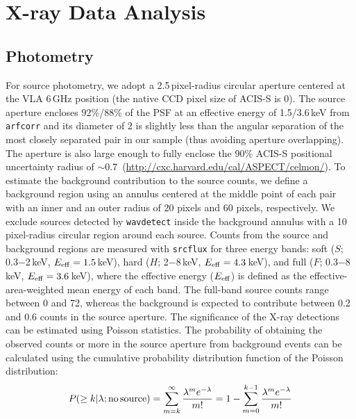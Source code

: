 \documentclass[iop,revtex4,twocolumn,apj,numberedappendix,appendixfloats]{emulateapj}
\begin{document}
\section{X-ray Data Analysis} \label{sec:analysis}

\subsection{Photometry} \label{sec:photo}

For source photometry, we adopt a 2.5\,pixel-radius circular aperture centered at the VLA 6\,GHz position (the native CCD pixel size of ACIS-S is 0). The source aperture encloses 92\%/88\% of the PSF at an effective energy of 1.5/3.6\,keV from \texttt{arfcorr} and its diameter of 2 is slightly less than the angular separation of the most closely separated pair in our sample (thus avoiding aperture overlapping). The aperture is also large enough to fully enclose the 90\% ACIS-S positional uncertainty radius of $\sim$0.7\arcsec\ (\url{http://cxc.harvard.edu/cal/ASPECT/celmon/}). To estimate the background contribution to the source counts, we define a background region using an annulus centered at the middle point of each pair with an inner and an outer radius of 20 pixels and 60 pixels, respectively. We exclude sources detected by \texttt{wavdetect} inside the background annulus with a 10\,pixel-radius circular region around each source. Counts from the source and background regions are measured with \texttt{srcflux} for three energy bands: soft ($S$; 0.3$-$2\,keV, $E_{\rm eff} = 1.5$\,keV), hard ($H$; 2$-$8\,keV, $E_{\rm eff} = 4.3$\,keV), and full ($F$; 0.3$-$8\,keV, $E_{\rm eff} = 3.6$\,keV), where the effective energy ($E_{\rm eff}$) is defined as the effective-area-weighted mean energy of each band. The full-band source counts range between 0 and 72, whereas the background is expected to contribute between 0.2 and 0.6 counts in the source aperture. The significance of the X-ray detections can be estimated using Poisson statistics. The probability of obtaining the observed counts or more in the source aperture from background events can be calculated using the cumulative probability distribution function of the Poisson distribution:
\begin{equation} \label{eq:significance}
P(\geq k | \lambda; {\rm no\,source}) = \sum_{m=k}^{\infty} \frac{\lambda^m e^{-\lambda}}{m!} = 1-\sum_{m=0}^{k-1} \frac{\lambda^m e^{-\lambda}}{m!}
\end{equation}
\end{document}
